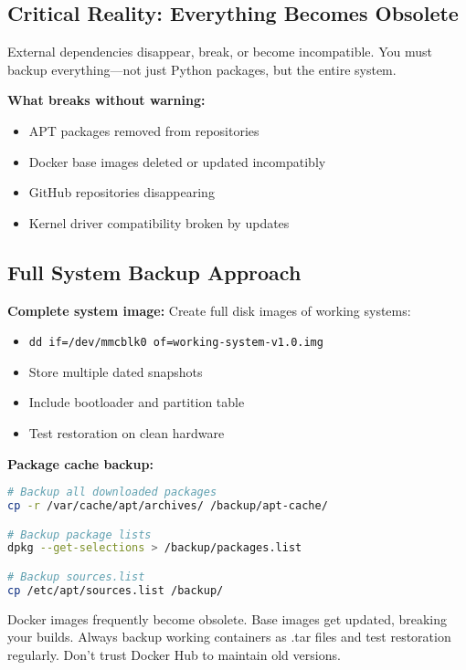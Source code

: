 \subsection{Critical Reality: Everything Becomes Obsolete}

External dependencies disappear, break, or become incompatible. You must backup everything—not just Python packages, but the entire system.

\textbf{What breaks without warning:}
\begin{itemize}
\item APT packages removed from repositories
\item Docker base images deleted or updated incompatibly
\item GitHub repositories disappearing
\item Kernel driver compatibility broken by updates
\end{itemize}

\subsection{Full System Backup Approach}

\textbf{Complete system image:}
Create full disk images of working systems:
\begin{itemize}
\item \texttt{dd if=/dev/mmcblk0 of=working-system-v1.0.img}
\item Store multiple dated snapshots
\item Include bootloader and partition table
\item Test restoration on clean hardware
\end{itemize}

\textbf{Package cache backup:}
\begin{tcolorbox}[colback=gray!5,colframe=gray!50,title=APT Package Backup]
\begin{lstlisting}[language=bash,basicstyle=\small\ttfamily]
# Backup all downloaded packages
cp -r /var/cache/apt/archives/ /backup/apt-cache/

# Backup package lists
dpkg --get-selections > /backup/packages.list

# Backup sources.list
cp /etc/apt/sources.list /backup/
\end{lstlisting}
\end{tcolorbox}

\begin{tcolorbox}[colback=red!10,colframe=red!75!black,title=Docker Reality Check]
Docker images frequently become obsolete. Base images get updated, breaking your builds. Always backup working containers as .tar files and test restoration regularly. Don't trust Docker Hub to maintain old versions.
\end{tcolorbox}

